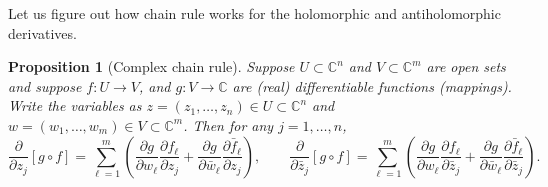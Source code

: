 \documentclass[12pt,openany]{book}
\newcommand{\C}{{\mathbb{C}}}
\theoremstyle{plain}
\newtheorem{prop}[thm]{Proposition}
\theoremstyle{remark}
\theoremstyle{definition}
\theoremstyle{exercise}
\theoremstyle{example}
\begin{document}
Let us figure out how chain rule works for the holomorphic and
antiholomorphic derivatives.

\begin{prop}[Complex chain rule]
Suppose 
$U \subset \C^n$ and $V \subset \C^m$ are open sets and suppose
$f \colon U \to V$, and $g \colon V \to \C$ are (real) differentiable
functions (mappings).  Write the variables as
$z = (z_1,\ldots,z_n) \in U \subset \C^n$ and $w = (w_1,\ldots,w_m) \in V
\subset \C^m$.  Then for any $j=1,\ldots,n$,
\begin{equation} \label{eq:chainrule}
\frac{\partial}{\partial z_j} \left[ g \circ f \right]
=
\sum_{\ell=1}^m \left(
\frac{\partial g}{\partial w_\ell}
\frac{\partial f_\ell}{\partial z_j}
+
\frac{\partial g}{\partial \bar{w}_\ell}
\frac{\partial \bar{f}_\ell}{\partial z_j}
\right),  \qquad
\frac{\partial}{\partial \bar{z}_j} \left[ g \circ f \right]
=
\sum_{\ell=1}^m \left(
\frac{\partial g}{\partial w_\ell}
\frac{\partial f_\ell}{\partial \bar{z}_j}
+
\frac{\partial g}{\partial \bar{w}_\ell}
\frac{\partial \bar{f}_\ell}{\partial \bar{z}_j}
\right) .
\end{equation}
\end{prop}
\end{document}
